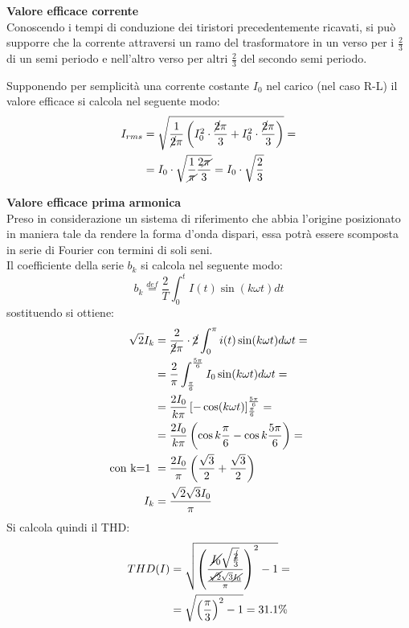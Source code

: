 \documentclass[a4paper,11pt]{article}
\begin{document}
\textbf{Valore efficace corrente}\\
Conoscendo i tempi di conduzione dei tiristori precedentemente ricavati, si può 
supporre che la corrente attraversi un ramo del trasformatore in un verso per i 
\(\frac{2}{3}\) di un semi periodo e nell'altro verso per altri \(\frac{2}{3}\)
del secondo semi periodo.

Supponendo per semplicità una corrente costante \(I_0\) nel carico (nel caso R-L) il valore
efficace si calcola nel seguente modo:
\begin{align*}
 I_{rms} &= \sqrt{\frac{1}{\cancel2\pi}\left(I_0^2\cdot\frac{\cancel2\pi}{3}+I_0^2\cdot
 \frac{\cancel2\pi}{3} \right)}=\\
 &=I_0\cdot\sqrt{\frac{1}{\cancel{\pi}}\frac{2\cancel{\pi}}{3}} = I_0\cdot\sqrt{\frac{2}{3}}
\end{align*}
\smallskip

\textbf{Valore efficace prima armonica}\\
Preso in considerazione un sistema di riferimento che abbia l'origine posizionato
in maniera tale da rendere la forma d'onda dispari, essa potrà essere scomposta
in serie di Fourier con termini di soli seni.\\
Il coefficiente della serie \(b_k\) si calcola nel seguente modo:
\begin{equation}
 b_k \stackrel{def}{=} \frac{2}{T}\int_0^t I(t)\sin(k\omega t) dt
\end{equation}
sostituendo si ottiene:
\begin{align*}
 \sqrt{2}I_k &= \frac{2}{\cancel{2}\pi}\cdot \cancel{2}\int_{0}^{\pi}i(t)\sin(k\omega t) d\omega t =\\
 &=\frac{2}{\pi}\int_{\frac{\pi}{6}}^{\frac{5\pi}{6}}I_0\sin(k\omega t)d\omega t=\\
 &= \frac{2I_0}{k\pi}\left[-\cos(k\omega t)\right]_{\frac{\pi}{6}}^{\frac{5\pi}{6}} =\\
 &=\frac{2I_0}{k\pi}\left(\cos k\frac{\pi}{6}-\cos k\frac{5\pi}{6}\right) =\\
 \text{con k=1 }&= \frac{2I_0}{\pi}\left(\frac{\sqrt{3}}{2} + \frac{\sqrt{3}}{2}  \right) \\
  I_k &= \frac{\sqrt{2}\sqrt{3}I_0}{\pi}
\end{align*}
Si calcola quindi il THD:
\begin{align*}
 THD(I) &= \sqrt{\left(\frac{\cancel{I_0}\sqrt{\frac{\cancel{2}}{3}}}{\frac{\cancel{\sqrt{2}}\sqrt{3}\cancel{I_0}}{\pi}}\right)^2-1  } = \\
 &= \sqrt{\left(\frac{\pi}{3}  \right)^2 -1 } = 31.1\%
\end{align*}
\end{document}
